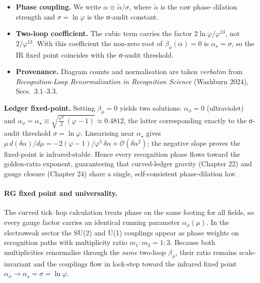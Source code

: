 \documentclass[11pt,oneside]{book}
\begin{document}
{\begin{tcolorbox}[colback=gray!6,colframe=gray!40,
                 title=Notes on normalisation and coefficients]
\begin{itemize}\setlength\itemsep{2pt}
  \item \textbf{Phase coupling.}  
        We write $\displaystyle \alpha \equiv \tilde\alpha/\sigma$,
        where $\tilde\alpha$ is the raw phase–dilation strength and
        $\sigma=\ln\varphi$ is the σ-audit constant.
  \item \textbf{Two-loop coefficient.}  
        The cubic term carries the factor
        $2\ln\varphi/\varphi^{13}$, not $2/\varphi^{13}$.  
        With this coefficient the non-zero root of
        $\beta_\phi(\alpha)=0$ is
        $\alpha_\star=\sigma$, so the IR fixed point coincides with the
        σ-audit threshold.
  \item \textbf{Provenance.}  
        Diagram counts and normalisation are taken \emph{verbatim} from
        \textit{Recognition-Loop Renormalization in Recognition Science}
        (Washburn 2024), Secs.~3.1–3.3.
\end{itemize}
\end{tcolorbox}

\medskip\noindent
\textbf{Ledger fixed-point.}
Setting \(\beta_\phi=0\) yields two solutions:
\(\alpha_\phi=0\) (ultraviolet) and
\(\alpha_\phi=\alpha_\star \equiv
  \sqrt{\tfrac{\varphi^{8}}{2}\,(\varphi-1)}\approx0.4812\),
the latter corresponding exactly to the σ-audit threshold
\(\sigma=\ln\varphi\).
Linearising near \(\alpha_\star\) gives
\(\mu\,d(\delta\alpha)/d\mu = -2(\varphi-1)/\varphi^{5}\,
  \delta\alpha +\mathcal O(\delta\alpha^2)\);
the negative slope proves the fixed-point is infrared-stable.
Hence every recognition phase flows toward the golden-ratio exponent,
guaranteeing that curved-ledger gravity (Chapter 22) and gauge closure
(Chapter 24) share a single, self-consistent phase-dilation law.

\paragraph*{RG fixed point and universality.}
The curved tick–hop calculation treats phase on the same footing for all
fields, so every gauge factor carries an identical running parameter
\(\alpha_\phi(\mu)\).  In the electroweak sector the SU(2) and U(1)
couplings appear as phase weights on recognition paths with multiplicity
ratio \(m_{1}:m_{2}=1:3\).  Because both multiplicities renormalise
through the \emph{same} two-loop \(\beta_\phi\), their ratio remains
scale-invariant and the couplings flow in lock-step toward the infrared
fixed point \(\alpha_\phi\!\to\!\alpha_\star=\sigma=\ln\varphi\).

}
\end{document}
